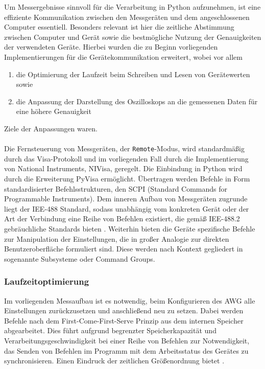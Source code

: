 \documentclass[../Report.tex]{subfiles}
\begin{document}
Um Messergebnisse sinnvoll für die Verarbeitung in Python aufzunehmen, ist eine effiziente Kommunikation zwischen den Messgeräten und dem angeschlossenen Computer essentiell. Besonders relevant ist hier die zeitliche Abstimmung zwischen Computer und Gerät sowie die bestmögliche Nutzung der Genauigkeiten der verwendeten Geräte. 
Hierbei wurden die zu Beginn vorliegenden Implementierungen für die Gerätekommunikation erweitert, wobei vor allem
\begin{enumerate}
	\item die Optimierung der Laufzeit beim Schreiben und Lesen von Gerätewerten sowie
	\item die Anpassung der Darstellung des Oszilloskops an die gemessenen Daten für eine höhere Genauigkeit
\end{enumerate}
Ziele der Anpassungen waren.
\\
\\
Die Fernsteuerung von Messgeräten, der \lstinline{Remote}-Modus, wird standardmäßig durch das Visa-Protokoll und im vorliegenden Fall durch die Implementierung von National Instruments, NIVisa, geregelt. Die Einbindung in Python wird durch die Erweiterung PyVisa ermöglicht. Übertragen werden Befehle in Form standardisierter Befehlsstrukturen, den SCPI (Standard Commands for Programmable Instruments). Dem inneren Aufbau von Messgeräten zugrunde liegt der IEE-488 Standard, sodass unabhängig vom konkreten Gerät oder der Art der Verbindung eine Reihe von Befehlen existiert, die gemäß IEE-488.2 gebräuchliche Standards bieten \cite[S. 224 ff.]{keysHand15}.
Weiterhin bieten die Geräte spezifische Befehle zur Manipulation der Einstellungen, die in großer Analogie zur direkten Benutzeroberfläche formuliert sind. Diese werden nach Kontext gegliedert in sogenannte Subsysteme oder Command Groups.


\subsubsection{Laufzeitoptimierung}
Im vorliegenden Messaufbau ist es notwendig, beim Konfigurieren des AWG alle Einstellungen zurückzusetzen und anschließend neu zu setzen. Dabei werden Befehle nach dem First-Come-First-Serve Prinzip aus dem internen Speicher abgearbeitet. Dies führt aufgrund begrenzter Speicherkapazität und Verarbeitungsgeschwindigkeit bei einer Reihe von Befehlen zur Notwendigkeit, das Senden von Befehlen im Programm mit dem Arbeitsstatus des Gerätes zu synchronisieren. Einen Eindruck der zeitlichen Größenordnung bietet .
\end{document}
